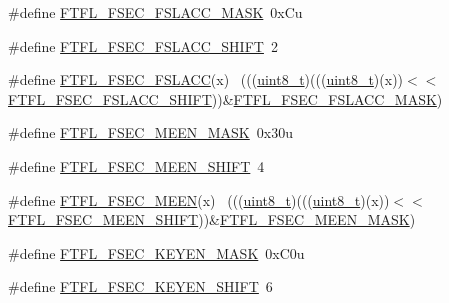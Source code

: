 \begin{DoxyCompactItemize}
\#define \hyperlink{group___f_t_f_l___register___masks_gaf2d2429c178b2b7cd61dc4682071bb3b}{F\+T\+F\+L\+\_\+\+F\+S\+E\+C\+\_\+\+F\+S\+L\+A\+C\+C\+\_\+\+M\+A\+SK}~0x\+Cu
\item 
\#define \hyperlink{group___f_t_f_l___register___masks_gab4d62d1117f55fd4febfff6784a7195f}{F\+T\+F\+L\+\_\+\+F\+S\+E\+C\+\_\+\+F\+S\+L\+A\+C\+C\+\_\+\+S\+H\+I\+FT}~2
\item 
\#define \hyperlink{group___f_t_f_l___register___masks_ga2972b4924daf741302ab52f6ffb88fd6}{F\+T\+F\+L\+\_\+\+F\+S\+E\+C\+\_\+\+F\+S\+L\+A\+CC}(x)                                        ~(((\hyperlink{_p_e___types_8h_aba7bc1797add20fe3efdf37ced1182c5}{uint8\+\_\+t})(((\hyperlink{_p_e___types_8h_aba7bc1797add20fe3efdf37ced1182c5}{uint8\+\_\+t})(x))$<$$<$\hyperlink{group___f_t_f_l___register___masks_gab4d62d1117f55fd4febfff6784a7195f}{F\+T\+F\+L\+\_\+\+F\+S\+E\+C\+\_\+\+F\+S\+L\+A\+C\+C\+\_\+\+S\+H\+I\+FT}))\&\hyperlink{group___f_t_f_l___register___masks_gaf2d2429c178b2b7cd61dc4682071bb3b}{F\+T\+F\+L\+\_\+\+F\+S\+E\+C\+\_\+\+F\+S\+L\+A\+C\+C\+\_\+\+M\+A\+SK})
\item 
\#define \hyperlink{group___f_t_f_l___register___masks_ga69ec5c88469db83b68d6984b293073a4}{F\+T\+F\+L\+\_\+\+F\+S\+E\+C\+\_\+\+M\+E\+E\+N\+\_\+\+M\+A\+SK}~0x30u
\item 
\#define \hyperlink{group___f_t_f_l___register___masks_ga52f5037890e8b5415825336203a71000}{F\+T\+F\+L\+\_\+\+F\+S\+E\+C\+\_\+\+M\+E\+E\+N\+\_\+\+S\+H\+I\+FT}~4
\item 
\#define \hyperlink{group___f_t_f_l___register___masks_ga69aa03e33f6e979e80bbc0bcd958f306}{F\+T\+F\+L\+\_\+\+F\+S\+E\+C\+\_\+\+M\+E\+EN}(x)                                            ~(((\hyperlink{_p_e___types_8h_aba7bc1797add20fe3efdf37ced1182c5}{uint8\+\_\+t})(((\hyperlink{_p_e___types_8h_aba7bc1797add20fe3efdf37ced1182c5}{uint8\+\_\+t})(x))$<$$<$\hyperlink{group___f_t_f_l___register___masks_ga52f5037890e8b5415825336203a71000}{F\+T\+F\+L\+\_\+\+F\+S\+E\+C\+\_\+\+M\+E\+E\+N\+\_\+\+S\+H\+I\+FT}))\&\hyperlink{group___f_t_f_l___register___masks_ga69ec5c88469db83b68d6984b293073a4}{F\+T\+F\+L\+\_\+\+F\+S\+E\+C\+\_\+\+M\+E\+E\+N\+\_\+\+M\+A\+SK})
\item 
\#define \hyperlink{group___f_t_f_l___register___masks_gab98903ddeed66e96877b9fa7cd2db5b7}{F\+T\+F\+L\+\_\+\+F\+S\+E\+C\+\_\+\+K\+E\+Y\+E\+N\+\_\+\+M\+A\+SK}~0x\+C0u
\item 
\#define \hyperlink{group___f_t_f_l___register___masks_ga78a40af3a63448325e92624831cfa97b}{F\+T\+F\+L\+\_\+\+F\+S\+E\+C\+\_\+\+K\+E\+Y\+E\+N\+\_\+\+S\+H\+I\+FT}~6

\end{DoxyCompactItemize}
